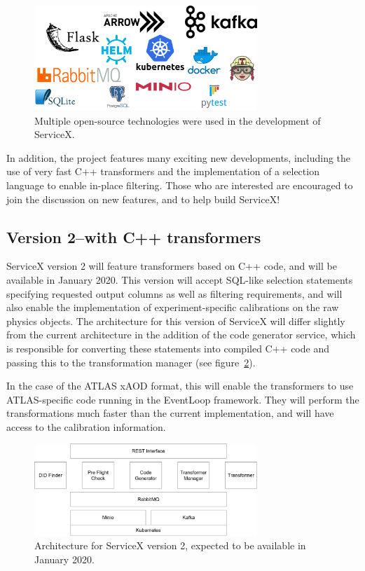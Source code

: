 \documentclass{webofc}
\begin{document}
\begin{figure}[ht]
  \centering
  \includegraphics[width=0.75\textwidth]{openSourceTech}
  \caption{Multiple open-source technologies were used in the development of ServiceX.}
  \label{fig:openSourceTech}
\end{figure}

In addition, the project features many exciting new developments, including the use of very fast
C++ transformers and the implementation of a selection language to enable in-place filtering. Those
who are interested are encouraged to join the discussion on new features, and to help build
ServiceX!

\subsection{Version 2--with C++ transformers}
\label{subsec:v2}

ServiceX version 2 will feature transformers based on C++ code, and will be available in January
2020. This version will accept SQL-like selection statements specifying requested output columns as
well as filtering requirements, and will also enable the implementation of experiment-specific
calibrations on the raw physics objects. The architecture for this version of ServiceX will differ
slightly from the current architecture in the addition of the code generator service, which is
responsible for converting these statements into compiled C++ code and passing this to the
transformation manager (see figure~\ref{fig:architectureV2}).

In the case of the ATLAS xAOD format, this will enable the transformers to use ATLAS-specific code
running in the EventLoop framework. They will perform the transformations much faster than the
current implementation, and will have access to the calibration information.

\begin{figure}[ht]
  \centering
  \includegraphics[width=0.75\textwidth]{architectureV2}
  \caption{Architecture for ServiceX version 2, expected to be available in January 2020.}
  \label{fig:architectureV2}
\end{figure}
\end{document}
